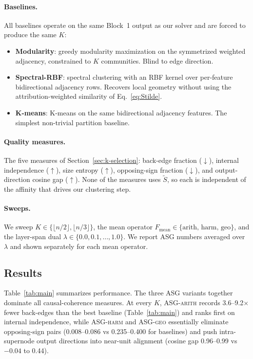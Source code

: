 \documentclass[table, 11pt]{article}
\begin{document}
\paragraph{Baselines.}
All baselines operate on the same Block~1 output as our solver and
are forced to produce the same $K$:
\begin{itemize}[leftmargin=*,topsep=2pt,itemsep=1pt]
\item \textbf{Modularity}: greedy modularity maximization on the
symmetrized weighted adjacency, constrained to $K$ communities. Blind
to edge direction.
\item \textbf{Spectral-RBF}: spectral clustering with an RBF kernel
over per-feature bidirectional adjacency rows. Recovers local
geometry without using the attribution-weighted similarity of
Eq.~\eqref{eq:Stilde}.
\item \textbf{K-means}: K-means on the same bidirectional adjacency
features. The simplest non-trivial partition baseline.
\end{itemize}

\paragraph{Quality measures.}
The five measures of Section~\ref{sec:k-selection}: back-edge fraction
($\downarrow$), internal independence ($\uparrow$), size entropy
($\uparrow$), opposing-sign fraction ($\downarrow$), and
output-direction cosine gap ($\uparrow$). None of the measures uses
$\tilde S$, so each is independent of the affinity that drives our
clustering step.

\paragraph{Sweeps.}
We sweep $K \in \{\lfloor n/2 \rfloor, \lfloor n/3 \rfloor\}$, the
mean operator $F_{\text{mean}} \in \{\text{arith, harm, geo}\}$, and
the layer-span dual $\lambda \in \{0.0, 0.1, \ldots, 1.0\}$. We
report ASG numbers averaged over $\lambda$ and shown separately for
each mean operator.

\subsection{Results}

Table~\ref{tab:main} summarizes performance. The three ASG variants
together dominate all causal-coherence measures. At every $K$,
\textsc{ASG-arith} records 3.6--9.2$\times$ fewer back-edges than
the best baseline (Table~\ref{tab:main}) and ranks first on internal
independence, while \textsc{ASG-harm} and \textsc{ASG-geo}
essentially eliminate opposing-sign pairs (0.008--0.086 vs
0.235--0.400 for baselines) and push intra-supernode output
directions into near-unit alignment (cosine gap 0.96--0.99 vs
$-0.04$ to 0.44).
\end{document}
